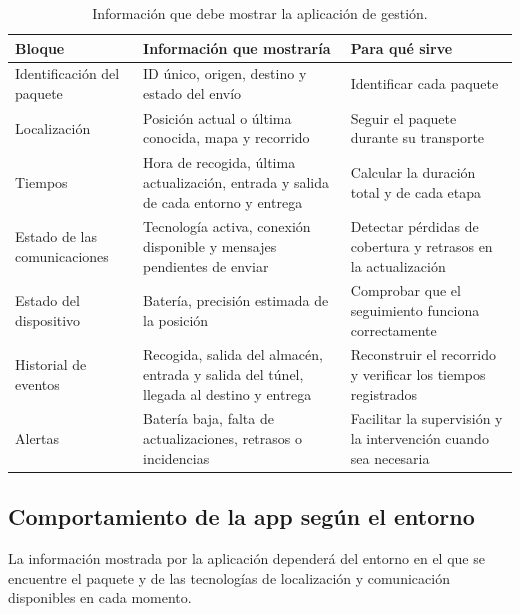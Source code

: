 \documentclass[11pt,a4paper]{article}
\begin{document}
\begin{table}[H]
    \centering
    \footnotesize
    \renewcommand{\arraystretch}{1.15}
    \begin{tabular}{@{}L{3.5cm}L{6.8cm}L{4.4cm}@{}}
        \toprule
        \textbf{Bloque} & \textbf{Información que mostraría} & \textbf{Para qué sirve} \\
        \midrule
        Identificación del paquete & ID único, origen, destino y estado del envío & Identificar cada paquete \\
        Localización & Posición actual o última conocida, mapa y recorrido & Seguir el paquete durante su transporte \\
        Tiempos & Hora de recogida, última actualización, entrada y salida de cada entorno y entrega & Calcular la duración total y de cada etapa \\
        Estado de las comunicaciones & Tecnología activa, conexión disponible y mensajes pendientes de enviar & Detectar pérdidas de cobertura y retrasos en la actualización \\
        Estado del dispositivo & Batería, precisión estimada de la posición & Comprobar que el seguimiento funciona correctamente \\
        Historial de eventos & Recogida, salida del almacén, entrada y salida del túnel, llegada al destino y entrega & Reconstruir el recorrido y verificar los tiempos registrados \\
        Alertas & Batería baja, falta de actualizaciones, retrasos o incidencias & Facilitar la supervisión y la intervención cuando sea necesaria \\
        \bottomrule
    \end{tabular}
    \caption{Información que debe mostrar la aplicación de gestión.}
    \label{tab:informacion_app}
\end{table}

\subsection{Comportamiento de la app según el entorno}
\label{sec:apartado8_3}

La información mostrada por la aplicación dependerá del entorno en el que se encuentre el paquete y de las tecnologías de localización y comunicación disponibles en cada momento.
\end{document}
